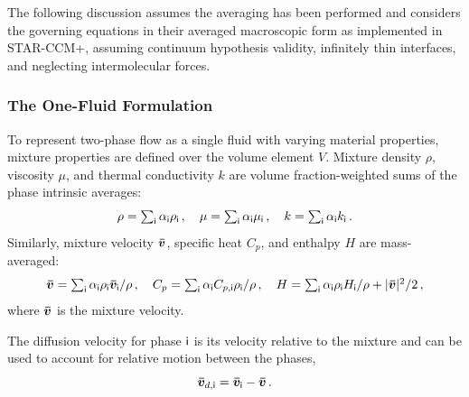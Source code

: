 The following discussion assumes the averaging has been performed and considers the 
 governing equations in their averaged macroscopic form as implemented in STAR-CCM+, 
 assuming continuum hypothesis validity, infinitely thin interfaces, and neglecting 
 intermolecular forces. %

\subsubsection{The One-Fluid Formulation}\label{sec:one-fluid}
To represent two-phase flow as a single fluid with varying material properties, 
mixture properties are defined over the volume element \(V\). Mixture 
density \(\rho\), viscosity \(\mu\), and thermal conductivity \(k\) are volume 
fraction-weighted sums of the phase intrinsic averages:
\begin{equation}
   \rho = \textstyle\sum\nolimits_{\mathsf {i}} \alpha_{\mathsf {i}} \rho_{\mathsf {i}}\,,\quad
   \mu = \textstyle\sum\nolimits_{\mathsf {i}} \alpha_{\mathsf {i}} \mu_{\mathsf {i}}\,,\quad
   k = \textstyle\sum\nolimits_{\mathsf {i}} \alpha_{\mathsf {i}} k_{\mathsf {i}}\,.
\end{equation}
Similarly, mixture velocity \(\bm{\bar{v}}\), specific heat \(C_p\), and enthalpy \(H\) are mass-averaged:
\begin{equation}\label{eq_vof_defs}
  \bm{\bar{v}} = \textstyle\sum\nolimits_{\mathsf {i}} \alpha_{\mathsf {i}} \rho_{\mathsf {i}} \bm{\bar{v}}_{\mathsf {i}}/ \rho\,,\quad
  C_{p} =\textstyle\sum\nolimits_{\mathsf {i}} \alpha_{\mathsf {i}} C_{p,\mathsf {i}} \rho_{\mathsf {i}}/\rho\,,\quad
  H =\textstyle\sum\nolimits_{\mathsf {i}} \alpha_{\mathsf {i}} \rho_{\mathsf {i}} H_{\mathsf {i}}/\rho + |\bm{\bar{v}}|^{2}/2\,,
\end{equation}
where \(\bm{\bar{v}}\) is the mixture velocity.

The diffusion velocity for phase \(\mathsf {i}\) is its velocity relative to the mixture and can be used to
account for relative motion between the phases,
\begin{equation}\label{eq:v-diff}
  \bm{\bar{v}}_{d,\mathsf {i}} = \bm{\bar{v}}_{\mathsf {i}} - \bm{\bar{v}}\,.
\end{equation} %

